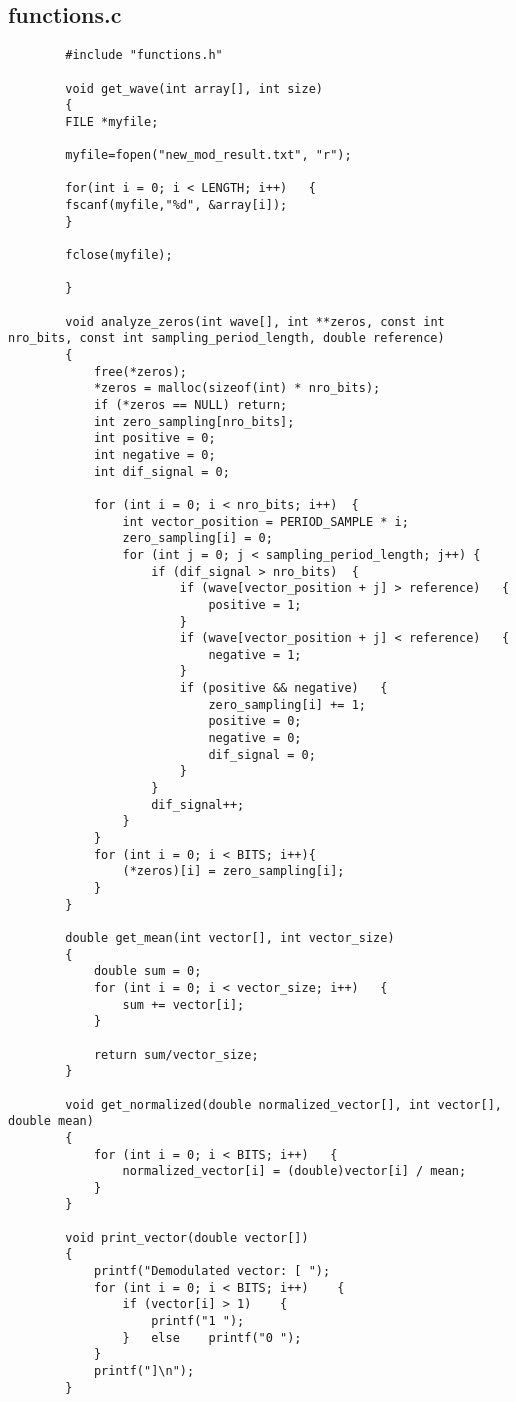 \documentclass[11pt,a4paper]{report}
\begin{document}
	
	\subsection{functions.c}
		\begin{verbatim}
		#include "functions.h"
		
		void get_wave(int array[], int size)
		{
		FILE *myfile;
		
		myfile=fopen("new_mod_result.txt", "r");
		
		for(int i = 0; i < LENGTH; i++)   {
		fscanf(myfile,"%d", &array[i]);
		}
		
		fclose(myfile);
		
		}
		
		void analyze_zeros(int wave[], int **zeros, const int nro_bits, const int sampling_period_length, double reference)
		{
			free(*zeros);
			*zeros = malloc(sizeof(int) * nro_bits);
			if (*zeros == NULL) return;
			int zero_sampling[nro_bits];
			int positive = 0;
			int negative = 0;
			int dif_signal = 0;
			
			for (int i = 0; i < nro_bits; i++)  {
				int vector_position = PERIOD_SAMPLE * i;
				zero_sampling[i] = 0;
				for (int j = 0; j < sampling_period_length; j++) {
					if (dif_signal > nro_bits)  {
						if (wave[vector_position + j] > reference)   {
							positive = 1;
						}
						if (wave[vector_position + j] < reference)   {
							negative = 1;
						}
						if (positive && negative)   {
							zero_sampling[i] += 1;
							positive = 0;
							negative = 0;
							dif_signal = 0;
						}
					}
					dif_signal++;
				}
			}
			for (int i = 0; i < BITS; i++){
				(*zeros)[i] = zero_sampling[i];
			}
		}
		
		double get_mean(int vector[], int vector_size)
		{
			double sum = 0;
			for (int i = 0; i < vector_size; i++)   {
				sum += vector[i];
			}
			
			return sum/vector_size;
		}
		
		void get_normalized(double normalized_vector[], int vector[], double mean)
		{
			for (int i = 0; i < BITS; i++)   {
				normalized_vector[i] = (double)vector[i] / mean;
			}
		}
		
		void print_vector(double vector[])
		{
			printf("Demodulated vector: [ ");
			for (int i = 0; i < BITS; i++)    {
				if (vector[i] > 1)    {
					printf("1 ");
				}   else    printf("0 "); 
			}
			printf("]\n");
		}
		\end{verbatim}
		
\end{document}
